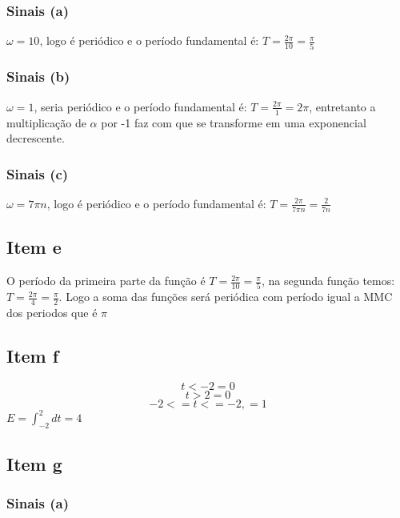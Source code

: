 \documentclass[a4paper, 12pt]{article}
\begin{document}
            \subsubsection{Sinais (a)}
            $\omega = 10$, logo é periódico e o período fundamental é: $T = \frac{2\pi}{10} = \frac{\pi}{5}$
            \subsubsection{Sinais (b)}
            $\omega = 1$, seria periódico e o período fundamental é: $T = \frac{2\pi}{1} = 2\pi$, entretanto a multiplicação de $\alpha$ por -1 faz com que se transforme em uma exponencial decrescente.
            \subsubsection{Sinais (c)}
            $\omega = 7\pi n$, logo é periódico e o período fundamental é: $T = \frac{2\pi}{7\pi n} = \frac{2}{7 n}$
        \subsection{Item e}
	        O período da primeira parte da função é $T = \frac{2\pi}{10} = \frac{\pi}{5}$, na segunda função temos: $T = \frac{2\pi}{4} = \frac{\pi}{2}$. Logo a soma das funções será periódica com período igual a MMC dos periodos que é $\pi$
        \subsection{Item f}
        \[t < -2 = 0\]
        \[t > 2 = 0\]
        \[ - 2 <= t <= -2, = 1\]
        $E = \int_{-2}^{2}dt = 4$
        \subsection{Item g}          
            \subsubsection{Sinais (a)}
\end{document}

